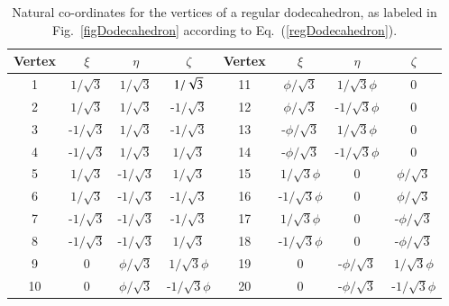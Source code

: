 \begin{table}
	\begin{center}
	\begin{tabular}{|c|ccc||c|ccc|}
		\hline 
		Vertex & $\xi$ & $\eta$ & $\zeta$ & Vertex & $\xi$ & $\eta$ & $\zeta$ \\ \hline
		1 & $1 / \sqrt{3}$ & $1 / \sqrt{3}$ & $1 / \sqrt{3}^{\vphantom{|}}$ & 
		   11 & $\phi / \sqrt{3}$ & $1 / \sqrt{3} \phi$ & 0 \\
		2 & $1 / \sqrt{3}$ & $1 / \sqrt{3}$ & -$1 / \sqrt{3}$ & 
		   12 & $\phi / \sqrt{3}$ & -$1 / \sqrt{3}\phi$ & 0 \\
		3 & -$1 / \sqrt{3}$ & $1 / \sqrt{3}$ & -$1 / \sqrt{3}$ & 
		   13 & -$\phi / \sqrt{3}$ & $1/ \sqrt{3}\phi$ & 0 \\
		4 & -$1 / \sqrt{3}$ & $1 / \sqrt{3}$ & $1 / \sqrt{3}$ & 
		   14 & -$\phi / \sqrt{3}$ & -$1 / \sqrt{3}\phi$ & 0 \\
		5 & $1 / \sqrt{3}$ & -$1 / \sqrt{3}$ & $1 / \sqrt{3}$ & 
		   15 & $1 / \sqrt{3} \phi$ & 0 & $\phi / \sqrt{3}$ \\
		6 & $1 / \sqrt{3}$ & -$1 / \sqrt{3}$ & -$1 / \sqrt{3}$ & 
		   16 & -$1 / \sqrt{3}\phi$ & 0 & $\phi / \sqrt{3}$ \\
		7 & -$1 / \sqrt{3}$ & -$1 / \sqrt{3}$ & -$1 / \sqrt{3}$ & 
		   17 & $1 / \sqrt{3}\phi$ & 0 & -$\phi / \sqrt{3}$ \\
		8 & -$1 / \sqrt{3}$ & -$1 / \sqrt{3}$ & $1 / \sqrt{3}$ & 
		   18 & -$1 / \sqrt{3}\phi$ & 0 & -$\phi / \sqrt{3}$ \\
		9 & 0 & $\phi / \sqrt{3}$ & $1 / \sqrt{3}\phi$ & 
		   19 & 0 & -$\phi / \sqrt{3}$ & $1 / \sqrt{3}\phi$ \\
		10 & 0 & $\phi / \sqrt{3}$ & -$1 / \sqrt{3}\phi$ & 
		   20 & 0 & -$\phi / \sqrt{3}$ & -$1 / \sqrt{3}\phi$ \\
		\hline
	\end{tabular}
	\end{center}
	\caption{Natural co-ordinates for the vertices of a regular dodecahedron, as labeled in Fig.~\ref{figDodecahedron} according to Eq.~(\ref{regDodecahedron}).}
	\label{TableDodecahedron}
\end{table}

